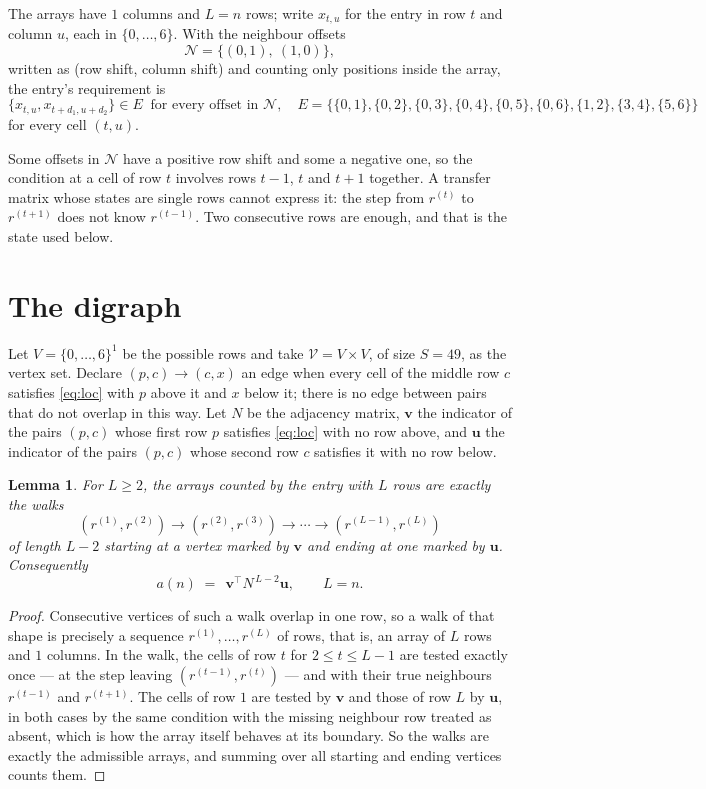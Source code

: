 \documentclass[11pt,a4paper]{article}
\theoremstyle{plain}
\newtheorem{lemma}[theorem]{Lemma}
\theoremstyle{definition}
\begin{document}
The arrays have $1$ columns and $L=n$ rows; write $x_{t,u}$ for the entry in
row $t$ and column $u$, each in $\{0,\dots,6\}$. With the neighbour offsets
\[
\mathcal N=\{(0,1),\ (1,0)\},
\]
written as (row shift, column shift) and counting only positions inside the array, the
entry's requirement is
\begin{equation}\label{eq:loc}
\{x_{t,u},x_{t+d_1,u+d_2}\}\in E\ \text{ for every offset in }\mathcal N,\quad E=\{\{0,1\},\{0,2\},\{0,3\},\{0,4\},\{0,5\},\{0,6\},\{1,2\},\{3,4\},\{5,6\}\}
\end{equation}
for every cell $(t,u)$.

Some offsets in $\mathcal N$ have a positive row shift and some a negative one, so the
condition at a cell of row $t$ involves rows $t-1$, $t$ and $t+1$ together. A transfer
matrix whose states are single rows cannot express it: the step from $r^{(t)}$ to
$r^{(t+1)}$ does not know $r^{(t-1)}$. Two consecutive rows are enough, and that is
the state used below.

\section{The digraph}

Let $V=\{0,\dots,6\}^{1}$ be the possible rows and take
$\mathcal V=V\times V$, of size $S=49$, as the vertex set. Declare $(p,c)\to(c,x)$ an edge
when every cell of the middle row $c$ satisfies \eqref{eq:loc} with $p$ above it and $x$
below it; there is no edge between pairs that do not overlap in this way. Let $N$ be the
adjacency matrix, $\mathbf{v}$ the indicator of the pairs $(p,c)$ whose first row $p$
satisfies \eqref{eq:loc} with no row above, and $\mathbf{u}$ the indicator of
the pairs $(p,c)$ whose second row $c$ satisfies it with no row below.

\begin{lemma}\label{lem:walk}
For $L\ge2$, the arrays counted by the entry with $L$ rows are exactly the walks
\[
(r^{(1)},r^{(2)})\to(r^{(2)},r^{(3)})\to\cdots\to(r^{(L-1)},r^{(L)})
\]
of length $L-2$ starting at a vertex marked by $\mathbf{v}$ and ending at one marked by
$\mathbf{u}$. Consequently
\[
a(n)\;=\;\,\mathbf{v}^{\!\top}N^{\,L-2}\mathbf{u},\qquad L=n .
\]
\end{lemma}

\begin{proof}
Consecutive vertices of such a walk overlap in one row, so a walk of that shape is
precisely a sequence $r^{(1)},\dots,r^{(L)}$ of rows, that is, an array of $L$ rows
and $1$ columns. In the walk, the cells of row $t$ for $2\le t\le L-1$ are tested
exactly once --- at the step leaving $(r^{(t-1)},r^{(t)})$ --- and with their true
neighbours $r^{(t-1)}$ and $r^{(t+1)}$. The cells of row $1$ are tested by
$\mathbf{v}$ and those of row $L$ by $\mathbf{u}$, in both cases by the same condition
with the missing neighbour row treated as absent, which is how the array itself behaves at
its boundary. So the walks are exactly the admissible arrays, and summing over all starting
and ending vertices counts them.
\end{proof}
\end{document}

